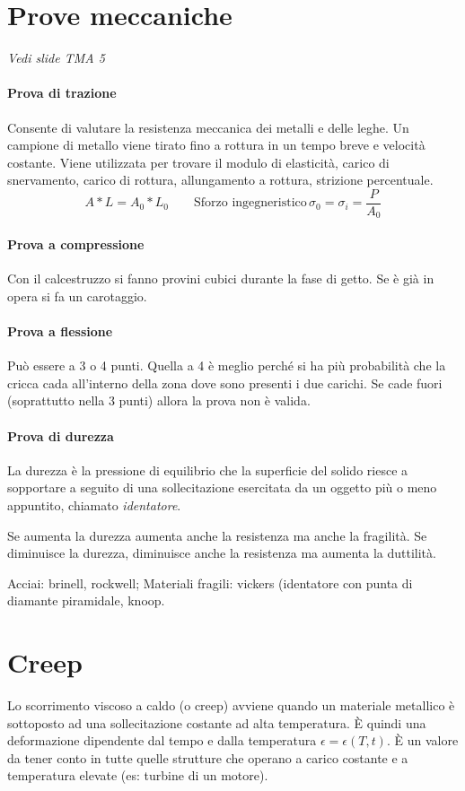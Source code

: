 \documentclass[a5paper,12pt]{article}
\newcommand{\e}{\`E\xspace}  %
\begin{document}
\section{Prove meccaniche}
\textit{Vedi slide TMA 5}
\paragraph{Prova di trazione} Consente di valutare la resistenza meccanica dei metalli e delle leghe. Un campione di metallo viene tirato fino a rottura in un tempo breve e velocità costante. Viene utilizzata per trovare il modulo di elasticità, carico di snervamento, carico di rottura, allungamento a rottura, strizione percentuale.
\[A*L = A_0 * L_0 \qquad \text{Sforzo ingegneristico}      \, \sigma_0 = \sigma_i = \frac{P}{A_0}\] 
\paragraph{Prova a compressione} Con il calcestruzzo si fanno provini cubici durante la fase di getto. Se è già in opera si fa un carotaggio. 
\paragraph{Prova a flessione} Può essere a 3 o 4 punti. Quella a 4 è meglio perché si ha più probabilità che la cricca cada all'interno della zona dove sono presenti i due carichi. Se cade fuori (soprattutto nella 3 punti) allora la prova non è valida.
\paragraph{Prova di durezza} La durezza è la pressione di equilibrio che la superficie del solido riesce a sopportare a seguito di una sollecitazione esercitata da un oggetto più o meno appuntito, chiamato \emph{identatore}.

Se aumenta la durezza aumenta anche la resistenza ma anche la fragilità. Se diminuisce la durezza, diminuisce anche la resistenza ma aumenta la duttilità.

Acciai: brinell, rockwell; Materiali fragili: vickers (identatore con punta di diamante piramidale, knoop.
\section{Creep}
Lo scorrimento viscoso a caldo (o creep) avviene quando un materiale metallico è sottoposto ad una sollecitazione costante ad alta temperatura. \e quindi una deformazione dipendente dal tempo e dalla temperatura $\epsilon = \epsilon(T,t)$. \e un valore da tener conto in tutte quelle strutture che operano a carico costante e a temperatura elevate (es: turbine di un motore). 
\end{document}
